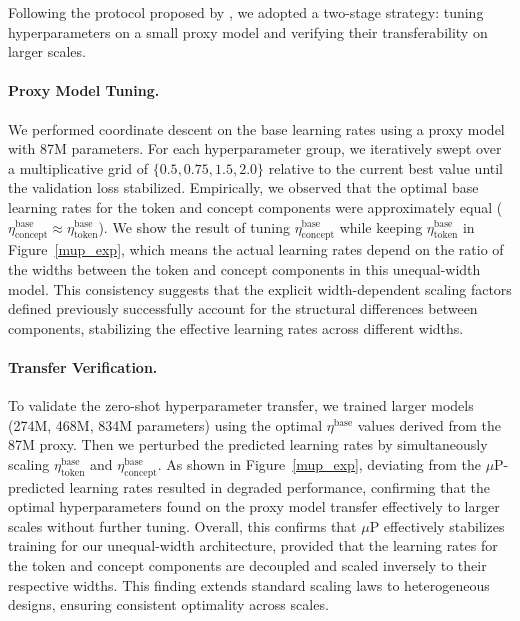 Following the protocol proposed by \citet{yang2022tensor}, we adopted a two-stage strategy: tuning hyperparameters on a small proxy model and verifying their transferability on larger scales.

\paragraph{Proxy Model Tuning.} We performed coordinate descent on the base learning rates using a proxy model with 87M parameters. For each hyperparameter group, we iteratively swept over a multiplicative grid of $\{0.5, 0.75, 1.5, 2.0\}$ relative to the current best value until the validation loss stabilized. Empirically, we observed that the optimal base learning rates for the token and concept components were approximately equal ($\eta^{\text{base}}_{\text{concept}} \approx \eta^{\text{base}}_{\text{token}}$). We show the result of tuning $\eta^{\text{base}}_{\text{concept}}$ while keeping $\eta^{\text{base}}_{\text{token}}$ in Figure~\ref{mup_exp}, which means the actual learning rates depend on the ratio of the widths between the token and concept components in this unequal-width model. This consistency suggests that the explicit width-dependent scaling factors defined previously successfully account for the structural differences between components, stabilizing the effective learning rates across different widths.

\paragraph{Transfer Verification.} To validate the zero-shot hyperparameter transfer, we trained larger models (274M, 468M, 834M parameters) using the optimal $\eta^{\text{base}}$ values derived from the 87M proxy. Then we perturbed the predicted learning rates by simultaneously scaling $\eta^{\text{base}}_{\text{token}}$ and $\eta^{\text{base}}_{\text{concept}}$. As shown in Figure~\ref{mup_exp}, deviating from the $\mu$P-predicted learning rates resulted in degraded performance, confirming that the optimal hyperparameters found on the proxy model transfer effectively to larger scales without further tuning. Overall, this confirms that $\mu$P effectively stabilizes training for our unequal-width architecture, provided that the learning rates for the token and concept components are decoupled and scaled inversely to their respective widths. This finding extends standard scaling laws to heterogeneous designs, ensuring consistent optimality across scales.

